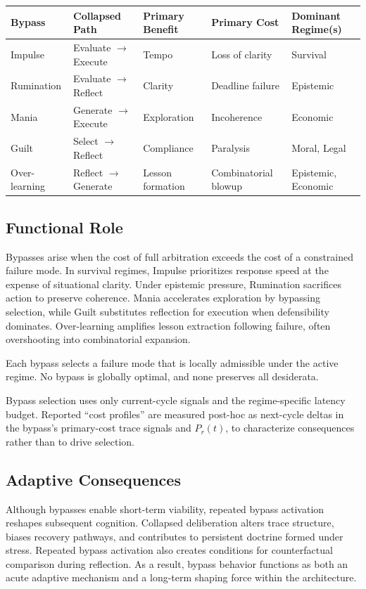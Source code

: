 \documentclass[11pt,a4paper]{article}
\begin{document}
\begin{center}
\begin{tabular}{lllll}
\toprule
\textbf{Bypass} & \textbf{Collapsed Path} & \textbf{Primary Benefit} & \textbf{Primary Cost} & \textbf{Dominant Regime(s)} \\
\midrule
Impulse & Evaluate $\to$ Execute & Tempo & Loss of clarity & Survival \\
Rumination & Evaluate $\to$ Reflect & Clarity & Deadline failure & Epistemic \\
Mania & Generate $\to$ Execute & Exploration & Incoherence & Economic \\
Guilt & Select $\to$ Reflect & Compliance & Paralysis & Moral, Legal \\
Over-learning & Reflect $\to$ Generate & Lesson formation & Combinatorial blowup & Epistemic, Economic \\
\bottomrule
\end{tabular}
\end{center}

\subsection{Functional Role}

Bypasses arise when the cost of full arbitration exceeds the cost of a constrained failure mode. In survival regimes, Impulse prioritizes response speed at the expense of situational clarity. Under epistemic pressure, Rumination sacrifices action to preserve coherence. Mania accelerates exploration by bypassing selection, while Guilt substitutes reflection for execution when defensibility dominates. Over-learning amplifies lesson extraction following failure, often overshooting into combinatorial expansion.

Each bypass selects a failure mode that is locally admissible under the active regime. No bypass is globally optimal, and none preserves all desiderata.

Bypass selection uses only current-cycle signals and the regime-specific latency budget. Reported ``cost profiles'' are measured post-hoc as next-cycle deltas in the bypass's primary-cost trace signals and $P_r(t)$, to characterize consequences rather than to drive selection.

\subsection{Adaptive Consequences}

Although bypasses enable short-term viability, repeated bypass activation reshapes subsequent cognition. Collapsed deliberation alters trace structure, biases recovery pathways, and contributes to persistent doctrine formed under stress. Repeated bypass activation also creates conditions for counterfactual comparison during reflection. As a result, bypass behavior functions as both an acute adaptive mechanism and a long-term shaping force within the architecture.
\end{document}
